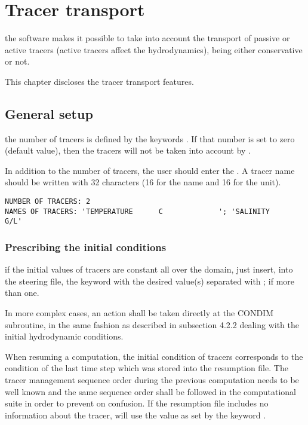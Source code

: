 \chapter{Tracer transport}

the  software makes it possible to take into account the transport of
passive or active tracers (active tracers affect the hydrodynamics), being
either conservative or not.

This chapter discloses the tracer transport features.


\section{General setup}

the number of tracers is defined by the keywords . If
that number is set to zero (default value), then the tracers will not be taken
into account by .

In addition to the number of tracers, the user should enter the . A tracer name should be written with 32 characters
(16 for the name and 16 for the unit).

\begin{lstlisting}[language=TelemacCas]
NUMBER OF TRACERS: 2
NAMES OF TRACERS: 'TEMPERATURE      C             '; 'SALINITY                     G/L'
\end{lstlisting}


\subsection{Prescribing the initial conditions}

if the initial values of tracers are constant all over the domain, just insert,
into the steering file, the keyword  with the
desired value(s) separated with ; if more than one.

In more complex cases, an action shall be taken directly at the CONDIM
subroutine, in the same fashion as described in subsection 4.2.2 dealing with
the initial hydrodynamic conditions.

When resuming a computation, the initial condition of tracers corresponds to
the condition of the last time step which was stored into the resumption file.
The tracer management sequence order during the previous computation needs to
be well known and the same sequence order shall be followed in the
computational suite in order to prevent on confusion. If the resumption file
includes no information about the tracer,  will use the value as set
by the keyword .


